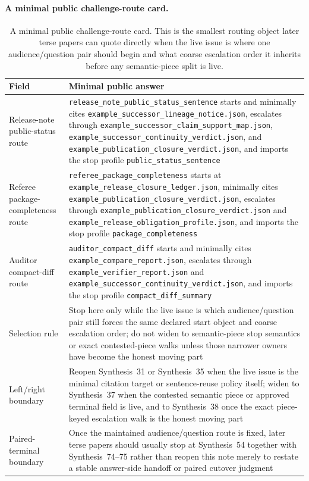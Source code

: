 \documentclass[11pt]{article}
\begin{document}
\paragraph{A minimal public challenge-route card.}
\begin{table}[t]
\centering
\small
\begin{tabularx}{\linewidth}{@{}lX@{}}
\toprule
Field & Minimal public answer \\
\midrule
Release-note public-status route & \nolinkurl{release_note_public_status_sentence} starts and minimally cites \nolinkurl{example_successor_lineage_notice.json}, escalates through \nolinkurl{example_successor_claim_support_map.json}, \nolinkurl{example_successor_continuity_verdict.json}, and \nolinkurl{example_publication_closure_verdict.json}, and imports the stop profile \nolinkurl{public_status_sentence} \\
Referee package-completeness route & \nolinkurl{referee_package_completeness} starts at \nolinkurl{example_release_closure_ledger.json}, minimally cites \nolinkurl{example_publication_closure_verdict.json}, escalates through \nolinkurl{example_publication_closure_verdict.json} and \nolinkurl{example_release_obligation_profile.json}, and imports the stop profile \nolinkurl{package_completeness} \\
Auditor compact-diff route & \nolinkurl{auditor_compact_diff} starts and minimally cites \nolinkurl{example_compare_report.json}, escalates through \nolinkurl{example_verifier_report.json} and \nolinkurl{example_successor_continuity_verdict.json}, and imports the stop profile \nolinkurl{compact_diff_summary} \\
Selection rule & Stop here only while the live issue is which audience/question pair still forces the same declared start object and coarse escalation order; do not widen to semantic-piece stop semantics or exact contested-piece walks unless those narrower owners have become the honest moving part \\
Left/right boundary & Reopen Synthesis~31 or Synthesis~35 when the live issue is the minimal citation target or sentence-reuse policy itself; widen to Synthesis~37 when the contested semantic piece or approved terminal field is live, and to Synthesis~38 once the exact piece-keyed escalation walk is the honest moving part \\
Paired-terminal boundary & Once the maintained audience/question route is fixed, later terse papers should usually stop at Synthesis~54 together with Synthesis~74--75 rather than reopen this note merely to restate a stable answer-side handoff or paired cutover judgment \\
\bottomrule
\end{tabularx}
\caption{A minimal public challenge-route card. This is the smallest routing object later terse papers can quote directly when the live issue is where one audience/question pair should begin and what coarse escalation order it inherits before any semantic-piece split is live.}
\label{tab:minimal-public-challenge-route-card}
\end{table}
\end{document}
